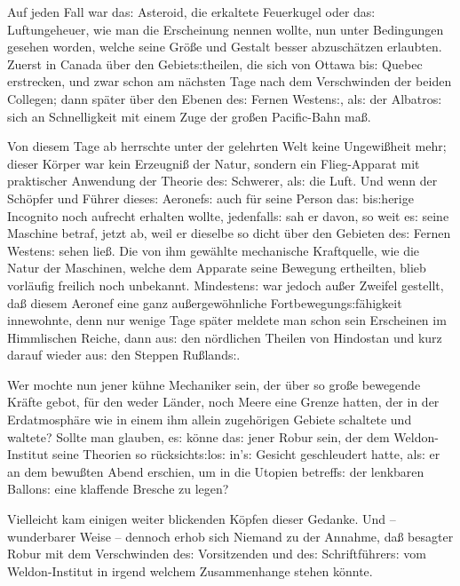 \documentclass[oneside,12pt]{book}
\newcommand{\s}{s:}
\begin{document}
Auf jeden Fall war da{\s} Asteroid, die erkaltete Feuerkugel oder
da{\s} Luftungeheuer, wie man die Erscheinung nennen wollte, nun
unter Bedingungen gesehen worden, welche seine Gr\"o{\ss}e und
Gestalt besser abzusch\"atzen erlaubten. Zuerst in Canada \"uber den
Gebiet{\s}theilen, die sich von Ottawa bi{\s} Quebec erstrecken, und
zwar schon am n\"achsten Tage nach dem Verschwinden der beiden
Collegen; dann sp\"ater \"uber den Ebenen de{\s} Fernen Westen{\s},
al{\s} der {\glqq}Albatro{\s}{\grqq} sich an Schnelligkeit mit einem
Zuge der gro{\ss}en Pacific-Bahn ma{\ss}.

Von diesem Tage ab herrschte unter der gelehrten Welt keine
Ungewi{\ss}heit mehr; dieser K\"orper war kein Erzeugni{\ss} der
Natur, sondern ein Flieg-Apparat mit praktischer Anwendung der
Theorie de{\s} {\glqq}Schwerer, al{\s} die Luft{\grqq}. Und wenn der
Sch\"opfer und F\"uhrer diese{\s} Aeronef{\s} auch f\"ur seine Person
da{\s} bi{\s}herige Incognito noch aufrecht erhalten wollte,
jedenfall{\s} sah er davon, so weit e{\s} seine Maschine betraf,
jetzt ab, weil er dieselbe so dicht \"uber den Gebieten de{\s} Fernen
Westen{\s} sehen lie{\ss}. Die von ihm gew\"ahlte mechanische
Kraftquelle, wie die Natur der Maschinen, welche dem Apparate seine
Bewegung ertheilten, blieb vorl\"aufig freilich noch unbekannt.
Mindesten{\s} war jedoch au{\ss}er Zweifel gestellt, da{\ss} diesem
Aeronef eine ganz au{\ss}ergew\"ohnliche Fortbewegung{\s}f\"ahigkeit
innewohnte, denn nur wenige Tage sp\"ater meldete man schon sein
Erscheinen im Himmlischen Reiche, dann au{\s} den n\"ordlichen
Theilen von Hindostan und kurz darauf wieder au{\s} den Steppen
Ru{\ss}land{\s}.

Wer mochte nun jener k\"uhne Mechaniker sein, der \"uber so gro{\ss}e
bewegende Kr\"afte gebot, f\"ur den weder L\"ander, noch Meere eine
Grenze hatten, der in der Erdatmosph\"are wie in einem ihm allein
zugeh\"origen Gebiete schaltete und waltete? Sollte man glauben,
e{\s} k\"onne da{\s} jener Robur sein, der dem Weldon-Institut seine
Theorien so r\"ucksicht{\s}lo{\s} in'{\s} Gesicht geschleudert hatte,
al{\s} er an dem bewu{\ss}ten Abend erschien, um in die Utopien
betreff{\s} der lenkbaren Ballon{\s} eine klaffende Bresche zu legen?

Vielleicht kam einigen weiter blickenden K\"opfen dieser Gedanke. Und
-- wunderbarer Weise -- dennoch erhob sich Niemand zu der Annahme,
da{\ss} besagter Robur mit dem Verschwinden de{\s} Vorsitzenden und
de{\s} Schriftf\"uhrer{\s} vom Weldon-Institut in irgend welchem
Zusammenhange stehen k\"onnte.
\end{document}
